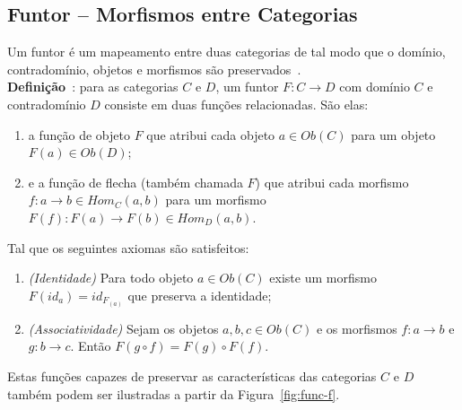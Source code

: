 \documentclass[10pt, conference]{IEEEtran}
\begin{document}
\subsection{Funtor -- Morfismos entre Categorias}
\label{subsec:funtor}
Um funtor é um mapeamento entre duas categorias de tal modo que o domínio, contradomínio, objetos e morfismos são preservados~\cite{awodey2010category}.\\

\textbf{Definição}~\cite{maclane1971mat, spivak2014cts}: para as categorias $C$ e $D$, um funtor $F:C \rightarrow D$ com domínio $C$ e contradomínio $D$ consiste em duas funções relacionadas. São elas:

\begin{enumerate}[label=(\alph*), leftmargin=3em, topsep = 0pt, itemsep = 1ex, partopsep = 1ex, parsep = 1ex]
	\item a função de objeto $F$ que atribui cada objeto $a \in Ob(C)$ para um objeto $F(a) \in Ob(D)$;
	\item e a função de flecha (também chamada $F$) que atribui cada morfismo $f: a \rightarrow b \in Hom_C(a, b)$ para um morfismo $F(f):F(a) \rightarrow F(b) \in Hom_D(a, b)$.
\end{enumerate}

\bigskip

Tal que os seguintes axiomas são satisfeitos:

\begin{enumerate}[label={}, leftmargin = 2em, topsep = 0pt, itemsep = 1ex,partopsep = 1ex, parsep = 1ex]
	\item \textit{(Identidade)} Para todo objeto $a \in Ob(C)$ existe um morfismo $F(id_a) = id_{F_{(a)}}$ que preserva a identidade;
	\item \textit{(Associatividade)} Sejam os objetos $a, b, c \in Ob(C)$ e os morfismos $f: a \rightarrow b$ e $g: b \rightarrow c$. Então $F(g \circ  f) = F(g) \circ F(f)$.
\end{enumerate}

\bigskip

Estas funções capazes de preservar as características das categorias $C$ e $D$ também podem ser ilustradas a partir da Figura~\ref{fig:func-f}.
\end{document}
